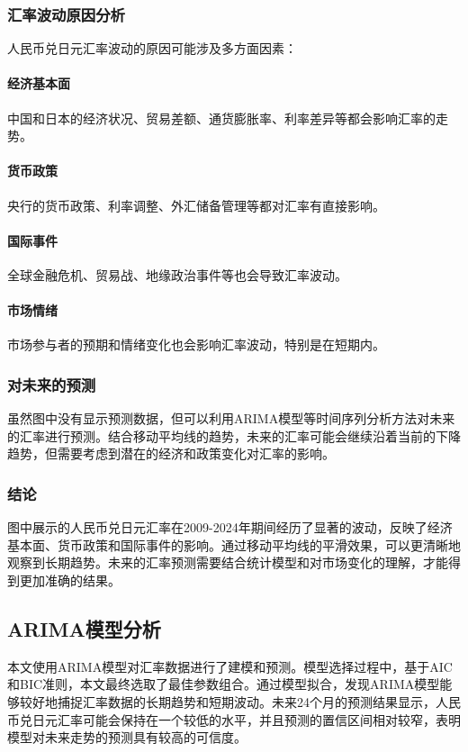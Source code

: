 \subsubsection{汇率波动原因分析}
人民币兑日元汇率波动的原因可能涉及多方面因素：
\paragraph{经济基本面}中国和日本的经济状况、贸易差额、通货膨胀率、利率差异等都会影响汇率的走势。
\paragraph{货币政策}央行的货币政策、利率调整、外汇储备管理等都对汇率有直接影响。
\paragraph{国际事件}全球金融危机、贸易战、地缘政治事件等也会导致汇率波动。
\paragraph{市场情绪}市场参与者的预期和情绪变化也会影响汇率波动，特别是在短期内。

\subsubsection{对未来的预测}
虽然图中没有显示预测数据，但可以利用ARIMA模型等时间序列分析方法对未来的汇率进行预测。结合移动平均线的趋势，未来的汇率可能会继续沿着当前的下降趋势，但需要考虑到潜在的经济和政策变化对汇率的影响。

\subsubsection{结论}
图中展示的人民币兑日元汇率在2009-2024年期间经历了显著的波动，反映了经济基本面、货币政策和国际事件的影响。通过移动平均线的平滑效果，可以更清晰地观察到长期趋势。未来的汇率预测需要结合统计模型和对市场变化的理解，才能得到更加准确的结果。

\subsection{ARIMA模型分析}
本文使用ARIMA模型对汇率数据进行了建模和预测。模型选择过程中，基于AIC和BIC准则，本文最终选取了最佳参数组合。通过模型拟合，发现ARIMA模型能够较好地捕捉汇率数据的长期趋势和短期波动。未来24个月的预测结果显示，人民币兑日元汇率可能会保持在一个较低的水平，并且预测的置信区间相对较窄，表明模型对未来走势的预测具有较高的可信度。

